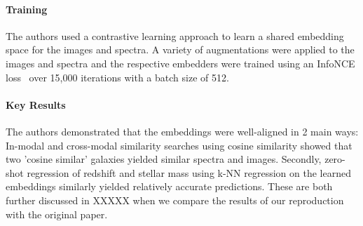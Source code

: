 \paragraph{Training} The authors used a contrastive learning approach to learn a shared embedding space for the images
and spectra.
A variety of augmentations were applied to the images and spectra and the respective embedders were trained using an
InfoNCE loss~\citep{infonce2020} over 15,000 iterations with a batch size of 512.

\paragraph{Key Results} The authors demonstrated that the embeddings were well-aligned in 2 main ways:
In-modal and cross-modal similarity searches using cosine similarity showed that two 'cosine similar' galaxies yielded
similar spectra and images.
Secondly, zero-shot regression of redshift and stellar mass using k-NN regression on the learned embeddings similarly
yielded relatively accurate predictions.
These are both further discussed in XXXXX when we compare the results of our reproduction with the original paper.
